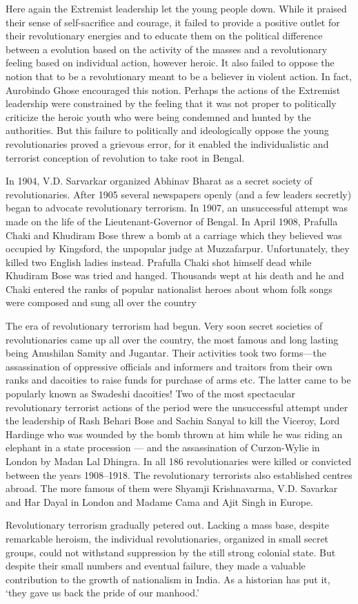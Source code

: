 \begin{multicols}{2}
Here again the Extremist leadership let the young people down. While it praised their sense of self-sacrifice and courage, it failed to provide a positive outlet for their revolutionary energies and to educate them on the political difference between a evolution based on the activity of the masses and a revolutionary feeling based on individual action, however heroic. It also failed to oppose the notion that to be a revolutionary meant to be a believer in violent action. In fact, Aurobindo Ghose encouraged this notion. Perhaps the actions of the Extremist leadership were constrained by the feeling that it was not proper to politically criticize the heroic youth who were being condemned and hunted by the authorities. But this failure to politically and ideologically oppose the young revolutionaries proved a grievous error, for it enabled the individualistic and terrorist conception of revolution to take root in Bengal.

In 1904, V.D. Sarvarkar organized Abhinav Bharat as a secret society of revolutionaries. After 1905 several newspapers openly (and a few leaders secretly) began to advocate revolutionary terrorism. In 1907, an unsuccessful attempt was made on the life of the Lieutenant-Governor of Bengal. In April 1908, Prafulla Chaki and Khudiram Bose threw a bomb at a carriage which they believed was occupied by Kingsford, the unpopular judge at Muzzafarpur. Unfortunately, they killed two English ladies instead. Prafulla Chaki shot himself dead while Khudiram Bose was tried and hanged. Thousands wept at his death and he and Chaki entered the ranks of popular nationalist heroes about whom folk songs were composed and sung all over the country

The era of revolutionary terrorism had begun. Very soon secret societies of revolutionaries came up all over the country, the most famous and long lasting being Anushilan Samity and Jugantar. Their activities took two forms---the assassination of oppressive officials and informers and traitors from their own ranks and dacoities to raise funds for purchase of arms etc. The latter came to be popularly known as Swadeshi dacoities! Two of the most spectacular revolutionary terrorist actions of the period were the unsuccessful attempt under the leadership of Rash Behari Bose and Sachin Sanyal to kill the Viceroy, Lord Hardinge who was wounded by the bomb thrown at him while he was riding an elephant in a state procession --- and the assassination of Curzon-Wylie in London by Madan Lal Dhingra. In all 186 revolutionaries were killed or convicted between the years 1908--1918. The revolutionary terrorists also established centres abroad. The more famous of them were Shyamji Krishnavarma, V.D. Savarkar and Har Dayal in London and Madame Cama and Ajit Singh in Europe.

Revolutionary terrorism gradually petered out. Lacking a mass base, despite remarkable heroism, the individual revolutionaries, organized in small secret groups, could not withstand suppression by the still strong colonial state. But despite their small numbers and eventual failure, they made a valuable contribution to the growth of nationalism in India. As a historian has put it, `they gave us back the pride of our manhood.'
\end{multicols}